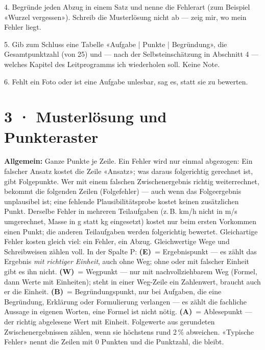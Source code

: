 \documentclass[11pt]{article}
\begin{document}
\begin{tcolorbox}[breakable,colback=lplinie!25,colframe=lplinie,boxrule=0.5pt,arc=1mm,fontupper=\small]
4. Begründe jeden Abzug in einem Satz und nenne die Fehlerart (zum Beispiel «Wurzel vergessen»). Schreib die Musterlösung nicht ab — zeig mir, wo mein Fehler liegt.\par
5. Gib zum Schluss eine Tabelle «Aufgabe | Punkte | Begründung», die Gesamtpunktzahl (von 25) und — nach der Selbsteinschätzung in Abschnitt 4 — welches Kapitel des Leitprogramms ich wiederholen soll. Keine Note.\par
6. Fehlt ein Foto oder ist eine Aufgabe unlesbar, sag es, statt sie zu bewerten.
\end{tcolorbox}

\section*{3 · Musterlösung und Punkteraster}
\textbf{Allgemein:} Ganze Punkte je Zeile. Ein Fehler wird nur einmal abgezogen: Ein falscher Ansatz kostet die Zeile «Ansatz»; was daraus folgerichtig gerechnet ist, gibt Folgepunkte. Wer mit einem falschen Zwischenergebnis
richtig weiterrechnet, bekommt die folgenden Zeilen (Folgefehler) — auch wenn das Folgeergebnis unplausibel ist; eine fehlende
Plausibilitätsprobe kostet keinen zusätzlichen Punkt. Derselbe Fehler in mehreren Teilaufgaben (z.\,B. km/h nicht in m/s umgerechnet, Masse in g statt kg eingesetzt) kostet nur beim ersten Vorkommen einen Punkt; die anderen Teilaufgaben werden folgerichtig bewertet. Gleichartige Fehler kosten gleich viel: ein Fehler, ein Abzug. Gleichwertige Wege und Schreibweisen zählen voll.
In der Spalte P: \textbf{(E)}~= Ergebnispunkt — es zählt das Ergebnis \emph{mit richtiger Einheit}, auch ohne Weg; ohne oder mit
falscher Einheit gibt es ihn nicht. \textbf{(W)}~= Wegpunkt — nur mit nachvollziehbarem Weg (Formel, dann Werte mit Einheiten);
steht in einer Weg-Zeile ein Zahlenwert, braucht auch er die Einheit. \textbf{(B)}~= Begründungspunkt, nur bei Aufgaben, die eine Begründung, Erklärung oder Formulierung verlangen — es zählt die fachliche
Aussage in eigenen Worten, eine Formel ist nicht nötig. \textbf{(A)}~= Ablesepunkt — der richtig abgelesene Wert mit Einheit.
Folgewerte aus gerundeten Zwischenergebnissen zählen, wenn sie höchstens rund 2\,\% abweichen. «Typische Fehler» nennt die Zeilen mit 0 Punkten und die Punktzahl, die bleibt.
\end{document}
